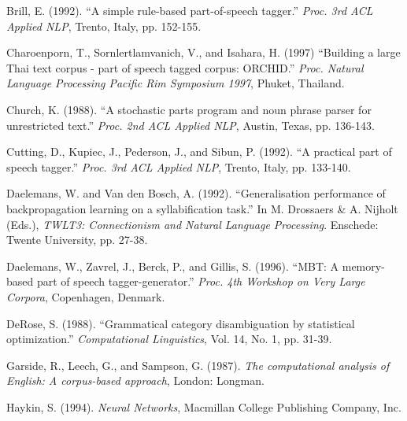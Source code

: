 \begin{thebibliography}{99}
Brill, E. (1992). ``A simple rule-based part-of-speech tagger.'' {\it Proc. 3rd ACL 
  Applied NLP}, Trento, Italy, pp. 152-155.

Charoenporn, T., Sornlertlamvanich, V., and Isahara, H. (1997) ``Building a
large Thai text corpus - part of speech tagged corpus: ORCHID.'' {\it Proc.
Natural Language Processing Pacific Rim Symposium 1997}, Phuket,
Thailand.

Church, K. (1988). ``A stochastic parts program and noun phrase parser for
unrestricted text.'' {\it Proc. 2nd ACL Applied NLP}, Austin, Texas,
pp. 136-143.

Cutting, D., Kupiec, J., Pederson, J., and Sibun, P. (1992).
``A practical part of speech tagger.'' {\it Proc. 3rd ACL Applied NLP},
Trento, Italy, pp. 133-140.

Daelemans, W. and Van den Bosch, A. (1992). ``Generalisation performance of
backpropagation learning on a syllabification task.'' In M. Drossaers \&
A. Nijholt (Eds.), {\em TWLT3: Connectionism and Natural Language
  Processing}. Enschede: Twente University, pp. 27-38.

Daelemans, W., Zavrel, J., Berck, P., and Gillis, S. (1996).
``MBT: A memory-based part of speech tagger-generator.'' {\it Proc. 4th
  Workshop on Very Large Corpora}, Copenhagen, Denmark.

DeRose, S. (1988). ``Grammatical category disambiguation by statistical
optimization.'' {\it Computational Linguistics}, Vol. 14, No. 1, pp. 31-39.

Garside, R., Leech, G., and Sampson, G. (1987). {\it The computational analysis
  of English: A corpus-based approach}, London: Longman.

Haykin, S. (1994). {\it Neural Networks}, Macmillan College Publishing Company,
Inc.


\end{thebibliography}
